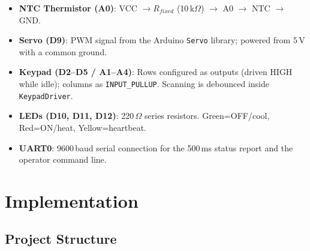 \documentclass[12pt]{article}
\begin{document}
\begin{itemize}
  \item \textbf{NTC Thermistor (A0)}: VCC $\to R_{fixed}$ (10\,k$\Omega$) $\to$ A0 $\to$ NTC $\to$ GND.
  \item \textbf{Servo (D9)}: PWM signal from the Arduino \texttt{Servo} library; powered from 5\,V with a common ground.
  \item \textbf{Keypad (D2--D5 / A1--A4)}: Rows configured as outputs (driven HIGH while idle); columns as \texttt{INPUT\_PULLUP}. Scanning is debounced inside \texttt{KeypadDriver}.
  \item \textbf{LEDs (D10, D11, D12)}: 220\,$\Omega$ series resistors. Green=OFF/cool, Red=ON/heat, Yellow=heartbeat.
  \item \textbf{UART0}: 9600\,baud serial connection for the 500\,ms status report and the operator command line.
\end{itemize}

\section{Implementation}

\subsection{Project Structure}
\end{document}
